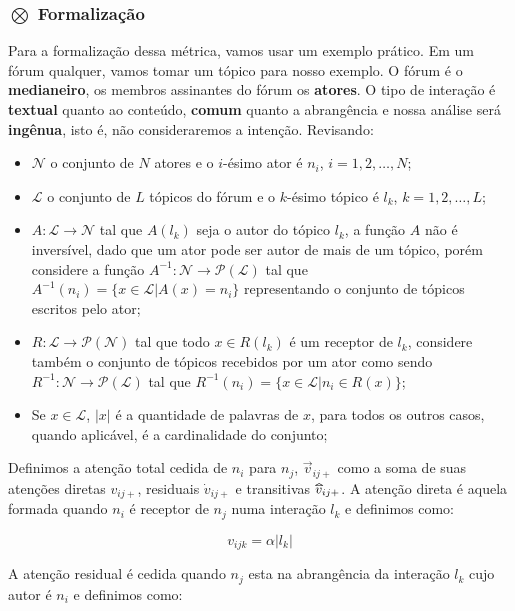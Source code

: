 \documentclass{article}
\begin{document}
\subsubsection{$\bigotimes$ Formalização}
\label{sec:formalizacao}
Para a formalização dessa métrica, vamos usar um exemplo prático. Em um fórum
qualquer, vamos tomar um tópico para nosso exemplo. O fórum é o
\textbf{medianeiro}, os membros assinantes do fórum os \textbf{atores}. O tipo de
interação é \textbf{textual} quanto ao conteúdo, \textbf{comum} quanto a
abrangência e nossa análise será \textbf{ingênua}, isto é, não consideraremos a
intenção. Revisando:
\begin{itemize}
  \item $\mathscr{N}$ o conjunto de $N$ atores e o $i$-ésimo ator é $n_i$,
  $i=1,2,\ldots,N$;
  \item $\mathscr{L}$ o conjunto de $L$ tópicos do fórum e o $k$-ésimo
  tópico é $l_k$, $k=1,2,\ldots,L$;
  \item $A:\mathscr{L}\to \mathscr{N}$ tal que $A(l_k)$ seja o
  autor do tópico $l_k$, a função $A$ não é inversível, dado que um ator pode
  ser autor de mais de um tópico, porém considere a função
  $A^{-1}:\mathscr{N}\to \mathscr{P}(\mathscr{L})$ tal que $A^{-1}(n_i) = \{x
  \in \mathscr{L}|A(x) = n_i\}$ representando o conjunto de tópicos escritos
  pelo ator;
  \item $R:\mathscr{L}\to \mathscr{P}(\mathscr{N})$ tal que todo $x \in R(l_k)$
  é um receptor de $l_k$, considere também o conjunto de tópicos recebidos por
  um ator como sendo $R^{-1}:\mathscr{N}\to \mathscr{P}(\mathscr{L})$ tal que
  $R^{-1}(n_i) = \{x \in \mathscr{L}|n_i\in R(x)\}$;
  \item Se $x \in \mathscr{L}$, $|x|$ é a quantidade de palavras de $x$, para
  todos os outros casos, quando aplicável, é a cardinalidade do conjunto;
\end{itemize}

Definimos a atenção total cedida de $n_i$ para $n_j$, $\vec{v}_{ij+}$
como a soma de suas atenções diretas $v_{ij+}$, residuais $\dot{v}_{ij+}$ e
transitivas $\widetriangle{v}_{ij+}$. A atenção direta é aquela formada quando
$n_i$ é receptor de $n_j$ numa interação $l_k$ e definimos como:

\begin{equation}
\label{def:atedireta}
v_{ijk} = \alpha |l_k| 
\end{equation}

A atenção residual é cedida quando $n_j$ esta na abrangência da interação $l_k$
cujo autor é $n_i$ e definimos como:
\end{document}
